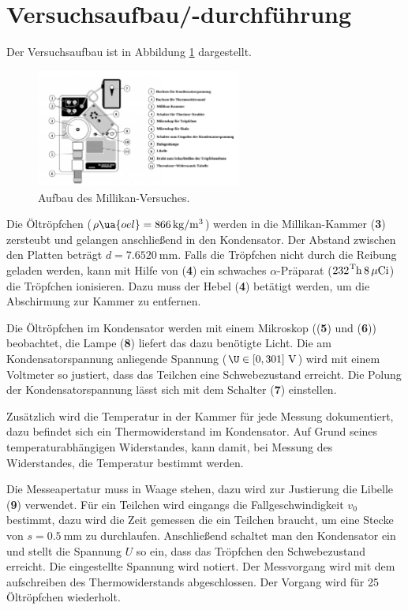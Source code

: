 \section{Versuchsaufbau/-durchführung}

Der Versuchsaufbau ist in Abbildung \ref{fig: versuchsaufabu} dargestellt.
\begin{figure}
  \centering
  \includegraphics[width=0.6\textwidth]{pics/aufbau.png}
  \caption{Aufbau des Millikan-Versuches\cite{anleitung703}.}
  \label{fig: versuchsaufabu}
  \end{figure}
Die Öltröpfchen ($\rho\ua{oel}=\SI{866}{\kilogram\per\cubic\meter}$) werden in die Millikan-Kammer (\textbf{3}) zersteubt
und gelangen anschließend in den Kondensator. Der Abstand zwischen den Platten beträgt $d=\SI{7.6520}{\milli\meter}$.
Falls die Tröpfchen nicht durch die
Reibung geladen werden, kann mit Hilfe von (\textbf{4}) ein schwaches
$\alpha$-Präparat ($\ce{{232}^Th}\,8\,\mu\ce{Ci}$) die Tröpfchen ionisieren. Dazu
muss der Hebel (\textbf{4}) betätigt werden, um die Abschirmung zur Kammer
zu entfernen.

Die Öltröpfchen im Kondensator werden mit einem Mikroskop ((\textbf{5}) und (\textbf{6})) beobachtet,
die Lampe (\textbf{8}) liefert das dazu benötigte Licht.
Die am Kondensatorspannung anliegende Spannung ($\U\in\left[0,301\right]\,\si{\volt}$)
wird mit einem Voltmeter so justiert, dass das Teilchen eine Schwebezustand erreicht.
Die Polung der Kondensatorspannung lässt sich mit dem Schalter (\textbf{7}) einstellen.

Zusätzlich wird die Temperatur in der Kammer für jede Messung dokumentiert, dazu befindet sich
ein Thermowiderstand im Kondensator. Auf Grund seines temperaturabhängigen Widerstandes, kann
damit, bei Messung des Widerstandes, die Temperatur bestimmt werden.

Die Messeapertatur muss in Waage stehen, dazu wird zur Justierung die
Libelle (\textbf{9}) verwendet.
Für ein Teilchen wird eingangs die Fallgeschwindigkeit $v_0$ bestimmt, dazu
wird die Zeit gemessen die ein Teilchen braucht, um eine Stecke von $s=\SI{0.5}{\milli\meter}$
zu durchlaufen. Anschließend schaltet man den Kondensator ein und stellt die Spannung
$U$ so ein, dass das Tröpfchen den Schwebezustand erreicht. Die eingestellte
Spannung wird notiert. Der Messvorgang wird mit dem aufschreiben des Thermowiderstands
abgeschlossen. Der Vorgang wird für 25 Öltröpfchen wiederholt.
